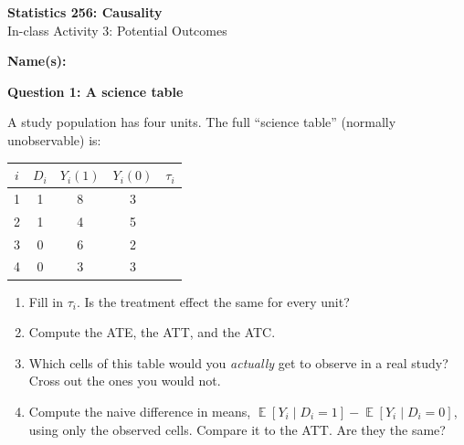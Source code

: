 \documentclass[11pt]{article}
\DeclareMathOperator{\E}{\mathbb{E}}
\begin{document}
\begin{center}
{\Large \textbf{Statistics 256: Causality}} \\[6pt]
{\large In-class Activity 3: Potential Outcomes}
\end{center}

\vspace{4pt}
\noindent\textbf{Name(s):} \hrulefill

\vspace{16pt}

\noindent\textbf{Question 1: A science table}

\medskip
\noindent A study population has four units. The full ``science table'' (normally unobservable) is:

\begin{center}
\begin{tabular}{c c c c c}
  $i$ & $D_i$ & $Y_i(1)$ & $Y_i(0)$ & $\tau_i$ \\ \hline
  1 & 1 & 8 & 3 & \\
  2 & 1 & 4 & 5 & \\
  3 & 0 & 6 & 2 & \\
  4 & 0 & 3 & 3 & \\
\end{tabular}
\end{center}

\begin{enumerate}[label=(\alph*)]
\item Fill in $\tau_i$. Is the treatment effect the same for every unit?

\vspace{1.2cm}

\item Compute the ATE, the ATT, and the ATC.

\vspace{2.5cm}

\item Which cells of this table would you \emph{actually} get to observe in a real study? Cross out the ones you would not.

\vspace{1cm}

\item Compute the naive difference in means, $\E[Y_i \mid D_i=1] - \E[Y_i \mid D_i=0]$, using only the observed cells. Compare it to the ATT. Are they the same?

\vspace{2.5cm}
\end{enumerate}
\end{document}
